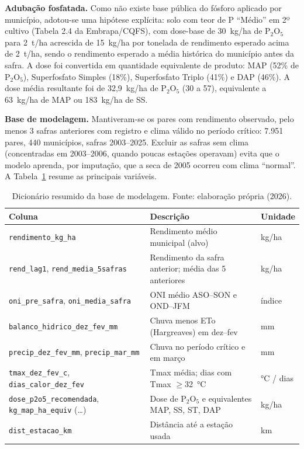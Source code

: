 \documentclass[12pt]{article}
\begin{document}
\textbf{Adubação fosfatada.} Como não existe base pública do fósforo
aplicado por município, adotou-se uma hipótese explícita: solo com teor de
P ``Médio'' em 2º cultivo (Tabela 2.4 da Embrapa/CQFS), com dose-base de
30~kg/ha de P$_2$O$_5$ para 2~t/ha acrescida de 15~kg/ha por tonelada de
rendimento esperado acima de 2~t/ha, sendo o rendimento esperado a média
histórica do município antes da safra. A dose foi convertida em quantidade
equivalente de produto: MAP (52\% de P$_2$O$_5$), Superfosfato Simples
(18\%), Superfosfato Triplo (41\%) e DAP (46\%). A dose média resultante foi
de 32,9~kg/ha de P$_2$O$_5$ (30 a 57), equivalente a 63~kg/ha de MAP ou
183~kg/ha de SS.

\textbf{Base de modelagem.} Mantiveram-se os pares com rendimento
observado, pelo menos 3 safras anteriores com registro e clima válido no
período crítico: 7.951 pares, 440 municípios, safras 2003--2025. Excluir as
safras sem clima (concentradas em 2003--2006, quando poucas estações
operavam) evita que o modelo aprenda, por imputação, que a seca de 2005
ocorreu com clima ``normal''. A Tabela~\ref{tab:dicionario} resume as
principais variáveis.

\begin{table}[ht]
\centering
\caption{Dicionário resumido da base de modelagem. Fonte: elaboração própria (2026).}
\label{tab:dicionario}
\footnotesize
\begin{tabular}{|p{5.0cm}|p{5.6cm}|p{1.5cm}|}
\hline
\textbf{Coluna} & \textbf{Descrição} & \textbf{Unidade} \\ \hline
\texttt{rendimento\_kg\_ha} & Rendimento médio municipal (alvo) & kg/ha \\ \hline
\texttt{rend\_lag1}, \texttt{rend\_media\_5safras} & Rendimento da safra anterior; média das 5 anteriores & kg/ha \\ \hline
\texttt{oni\_pre\_safra}, \texttt{oni\_media\_safra} & ONI médio ASO--SON e OND--JFM & índice \\ \hline
\texttt{balanco\_hidrico\_dez\_fev\_mm} & Chuva menos ETo (Hargreaves) em dez--fev & mm \\ \hline
\texttt{precip\_dez\_fev\_mm}, \texttt{precip\_mar\_mm} & Chuva no período crítico e em março & mm \\ \hline
\texttt{tmax\_dez\_fev\_c}, \texttt{dias\_calor\_dez\_fev} & Tmax média; dias com Tmax $\geq$32~°C & °C / dias \\ \hline
\texttt{dose\_p2o5\_recomendada}, \texttt{kg\_map\_ha\_equiv} (\ldots) & Dose de P$_2$O$_5$ e equivalentes MAP, SS, ST, DAP & kg/ha \\ \hline
\texttt{dist\_estacao\_km} & Distância até a estação usada & km \\ \hline
\end{tabular}
\end{table}
\end{document}
